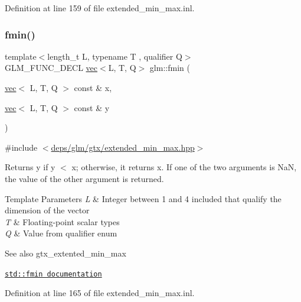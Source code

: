 Definition at line 159 of file extended\+\_\+min\+\_\+max.\+inl.

\mbox{\label{group__gtx__extended__min__max_ga7c42e93cd778c9181d1cdeea4d3e43bd}} 
\subsubsection{\texorpdfstring{fmin()}{fmin()}\hspace{0.1cm}{\footnotesize\ttfamily [3/3]}}
{\footnotesize\ttfamily template$<$length\+\_\+t L, typename T , qualifier Q$>$ \\
G\+L\+M\+\_\+\+F\+U\+N\+C\+\_\+\+D\+E\+CL \hyperlink{structglm_1_1vec}{vec}$<$L, T, Q$>$ glm\+::fmin (\begin{DoxyParamCaption}\item[{\hyperlink{structglm_1_1vec}{vec}$<$ L, T, Q $>$ const \&}]{x,  }\item[{\hyperlink{structglm_1_1vec}{vec}$<$ L, T, Q $>$ const \&}]{y }\end{DoxyParamCaption})}



{\ttfamily \#include $<$\hyperlink{extended__min__max_8hpp}{deps/glm/gtx/extended\+\_\+min\+\_\+max.\+hpp}$>$}

Returns y if y $<$ x; otherwise, it returns x. If one of the two arguments is NaN, the value of the other argument is returned.


\begin{DoxyTemplParams}{Template Parameters}
{\em L} & Integer between 1 and 4 included that qualify the dimension of the vector \\
\hline
{\em T} & Floating-\/point scalar types \\
\hline
{\em Q} & Value from qualifier enum\\
\hline
\end{DoxyTemplParams}
\begin{DoxySeeAlso}{See also}
gtx\+\_\+extented\+\_\+min\+\_\+max 

\href{http://en.cppreference.com/w/cpp/numeric/math/fmin}{\tt std\+::fmin documentation} 
\end{DoxySeeAlso}


Definition at line 165 of file extended\+\_\+min\+\_\+max.\+inl.



